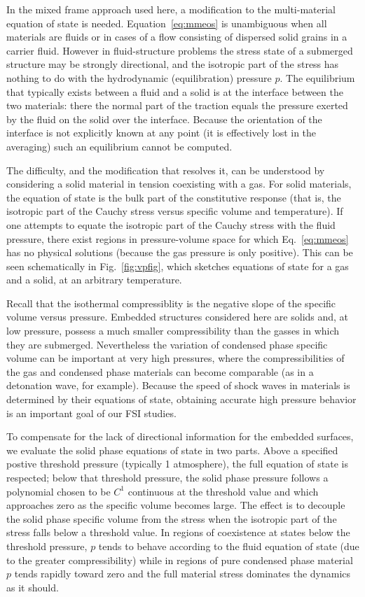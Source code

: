 In the mixed frame approach used here, a modification to the multi-material equation
of state is needed.  Equation~\ref{eq:mmeos} is unambiguous when all materials
are fluids or in cases of a flow consisting of dispersed solid
grains in a carrier fluid.  However in fluid-structure problems the stress
state of a submerged structure may be strongly directional, and the
isotropic part of the stress has nothing to do with the hydrodynamic
(equilibration) pressure $p$.  The equilibrium that typically exists between 
a fluid and a solid is at the interface between the two materials: there the 
normal part of the traction equals the pressure exerted by the fluid on the 
solid over the interface.  Because the orientation of the interface is not 
explicitly known at any point (it is effectively lost in the averaging) such 
an equilibrium cannot be computed.

The difficulty, and the modification that resolves it, can be understood by
considering a solid material in tension coexisting with a gas. 
For solid materials, the equation of state is the bulk part of the
constitutive response (that is, the isotropic part of the Cauchy stress versus
specific volume and temperature).  If one attempts to equate the isotropic
part of the Cauchy stress with the fluid pressure, there exist regions in
pressure-volume space for which Eq.~\ref{eq:mmeos} has no physical solutions
(because the gas pressure is only positive).  This can be seen schematically
in Fig.~\ref{fig:vpfig}, which sketches equations of state for a gas and a 
solid, at an arbitrary temperature.

Recall that the isothermal compressiblity is the negative slope of
the specific volume versus pressure.  Embedded structures considered here are
solids and, at low pressure, possess a much smaller
compressibility than the gasses in which they are submerged.  
Nevertheless the variation of condensed phase specific volume can be important
at very high pressures, where the compressibilities of the gas and condensed
phase materials can become comparable (as in a detonation wave, for
example).  Because the speed of shock waves in materials is determined by
their equations of state, obtaining accurate high pressure behavior is an
important goal of our FSI studies.

To compensate for the lack of directional information for the embedded
surfaces, we evaluate the solid phase equations of state
in two parts.  Above a specified postive threshold pressure 
(typically 1 atmosphere), the full equation of state is respected; below that 
threshold pressure, the solid phase pressure follows a
polynomial chosen to be $C^1$ continuous at the threshold value and
which approaches zero as the specific volume becomes large.  The effect
is to decouple the solid phase specific volume from the stress
when the isotropic part of the stress falls below a threshold value.  In 
regions of coexistence at states below the threshold pressure, $p$ tends 
to behave according to the fluid equation of state (due to the greater 
compressibility) while in regions of pure condensed phase material $p$ tends 
rapidly toward zero and the full material stress dominates the dynamics as 
it should.


